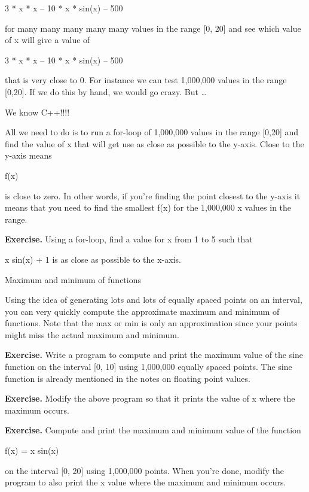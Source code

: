 \documentclass[
]{article}
\begin{document}
3 * x * x -- 10 * x * sin(x) -- 500

for many many many many many values in the range {[}0, 20{]} and see
which value of x will give a value of

3 * x * x -- 10 * x * sin(x) -- 500

that is very close to 0. For instance we can test 1,000,000 values in
the range {[}0,20{]}. If we do this by hand, we would go crazy. But
\ldots{}

We know C++!!!!

All we need to do is to run a for-loop of 1,000,000 values in the range
{[}0,20{]} and find the value of x that will get use as close as
possible to the y-axis. Close to the y-axis means

\textbar f(x)\textbar{}

is close to zero. In other words, if you're finding the point closest to
the y-axis it means that you need to find the smallest
\textbar f(x)\textbar{} for the 1,000,000 x values in the range.

\textbf{Exercise.} Using a for-loop, find a value for x from 1 to 5 such
that

x sin(x) + 1 is as close as possible to the x-axis.

Maximum and minimum of functions

Using the idea of generating lots and lots of equally spaced points on
an interval, you can very quickly compute the approximate maximum and
minimum of functions. Note that the max or min is only an approximation
since your points might miss the actual maximum and minimum.

\textbf{Exercise.} Write a program to compute and print the maximum
value of the sine function on the interval {[}0, 10{]} using 1,000,000
equally spaced points. The sine function is already mentioned in the
notes on floating point values.

\textbf{Exercise.} Modify the above program so that it prints the value
of x where the maximum occurs.

\textbf{Exercise.} Compute and print the maximum and minimum value of
the function

f(x) = x sin(x)

on the interval {[}0, 20{]} using 1,000,000 points. When you're done,
modify the program to also print the x value where the maximum and
minimum occurs.
\end{document}
